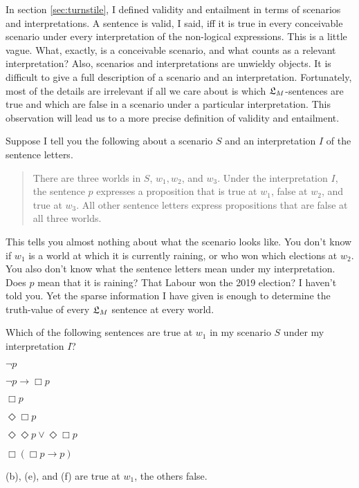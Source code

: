 In section \ref{sec:turnstile}, I defined validity and entailment in terms of
scenarios and interpretations. A sentence is valid, I said, iff it is true in
every conceivable scenario under every interpretation of the non-logical
expressions. This is a little vague. What, exactly, is a conceivable scenario,
and what counts as a relevant interpretation? Also, scenarios and
interpretations are unwieldy objects. It is difficult to give a full description
of a scenario and an interpretation. Fortunately, most of the details are
irrelevant if all we care about is which $\mathfrak{L}_{M}$-sentences are true and which
are false in a scenario under a particular interpretation. This observation will
lead us to a more precise definition of validity and entailment.

Suppose I tell you the following about a scenario $S$ and an interpretation $I$
of the sentence letters.

\begin{quote}
  There are three worlds in $S$, $w_{1}, w_{2}$, and $w_{3}$. Under the
  interpretation $I$, the sentence $p$ expresses a proposition that is true at
  $w_{1}$, false at $w_{2}$, and true at $w_{3}$. All other sentence letters
  express propositions that are false at all three worlds.
\end{quote}

This tells you almost nothing about what the scenario looks like. You don't know
if $w_{1}$ is a world at which it is currently raining, or who won which
elections at $w_{2}$. You also don't know what the sentence letters mean under
my interpretation. Does $p$ mean that it is raining? That Labour won the
2019 election? I haven't told you. Yet the sparse information I have given is
enough to determine the truth-value of every $\mathfrak{L}_{M}$ sentence at every world.

\begin{exercise}
  Which of the following sentences are true at $w_{1}$ in my scenario $S$ under
  my interpretation $I$?
  \begin{exlist}
  \item $\neg p$ %
  \item $\neg p \to \Box p$ %
  \item $\Box p$ %
  \item $\Diamond\Box p$ %
  \item $\Diamond \Diamond p \lor \Diamond \Box p$ %
  \item $\Box (\Box p \to p)$ %
  \end{exlist}
\end{exercise}
\begin{solution}
  (b), (e), and (f) are true at $w_{1}$, the others false.
\end{solution}

